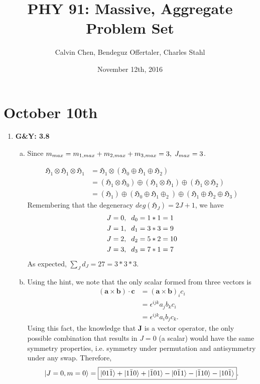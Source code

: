 \documentclass[12pt, letterpaper]{article}
\title{PHY 91: Massive, Aggregate Problem Set}
\author{Calvin Chen, Bendeguz Offertaler, Charles Stahl}
\date{November 12th, 2016}
\newcommand{\hilb}{\mathfrak{H}}
\begin{document}
\maketitle
\section*{October 10th}
\begin{enumerate}
    \item[] \textbf{G\&Y: 3.8}
    
\begin{enumerate}[(a)]
    \item 


Since $m_{max} = m_{1,max} + m_{2,max} + m_{3,max} = 3, \hspace{1mm} J_{max} = 3$.

\begin{align}
\hilb_1\otimes\hilb_1\otimes\hilb_1 &= \hilb_1 \otimes\left(\hilb_0\oplus
    \hilb_1 \oplus\hilb_2\right)\\
&= (\hilb_1\otimes\hilb_0)\oplus(\hilb_1\otimes\hilb_1)\oplus 
    (\hilb_1\otimes\hilb_2)\\
&= (\hilb_1)\oplus(\hilb_0\oplus\hilb_1\oplus_2) \oplus
    (\hilb_1\oplus\hilb_2\oplus\hilb_3)
\end{align}
Remembering that the degeneracy $deg(\hilb_J) = 2J+1$, we have
\begin{align}
&J = 0, \hspace{2mm}d_0 = 1*1 = 1\\
&J = 1, \hspace{2mm}d_1 = 3*3 = 9\\
&J = 2, \hspace{2mm}d_2 = 5*2 = 10\\
&J = 3, \hspace{2mm}d_3 = 7*1 = 7
\end{align}
As expected, $\sum_J d_J = 27 = 3*3*3$.

\item 
Using the hint, we note that the only scalar formed from three vectors is
\begin{align}
(\boldsymbol{a}\times\boldsymbol{b})\cdot\boldsymbol{c} &= 
    (\boldsymbol{a}\times\boldsymbol{b})_i c_i\\
&= \epsilon^{ijk}a_j b_k c_i\\
&= \epsilon^{ijk}a_i b_j c_k.
\end{align}
Using this fact, the knowledge that $\boldsymbol{J}$ is a vector operator, the only possible combination that results in $J=0$ (a scalar) would have the same symmetry properties, i.e. symmetry under permutation and antisymmetry under any swap. Therefore, 
\begin{align}
    \ket{J=0, m=0}=\boxed{\ket{01\bar{1}}+\ket{1\bar{1}0}+\ket{\bar{1}01}-
    \ket{0\bar{1}1}-\ket{\bar{1}10}-\ket{10\bar{1}}}.
\end{align}


\end{enumerate}
\end{enumerate}
\end{document}
